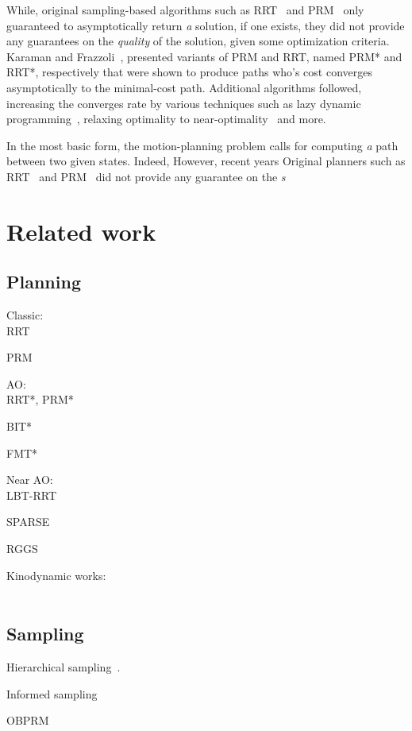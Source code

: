 \documentclass[letterpaper, 10 pt, conference]{ieeeconf}  %
\begin{document}
While, original sampling-based algorithms such as RRT~\cite{LK01} and PRM~\cite{KSLO96} only guaranteed to asymptotically return \emph{a} solution, if one exists, they did not provide any guarantees on the \emph{quality} of the solution, given some optimization criteria.
Karaman and Frazzoli~\cite{KF11}, presented variants of PRM and RRT, named PRM* and RRT*, respectively that were shown to produce paths who's cost converges asymptotically to the minimal-cost path.
Additional algorithms followed, increasing the converges rate by various techniques such as lazy dynamic programming~\cite{GSB15, JSCP15}, relaxing optimality to near-optimality~\cite{DB14, SH16} and more.


In the most basic form, the motion-planning problem calls for computing \emph{a} path between two given states.
Indeed, 
However, recent years 
Original planners such as RRT~\cite{LK01} and PRM~\cite{KSLO96} did not provide any guarantee on the \emph{s}


\section{Related work}


\subsection{Planning}


Classic:\\
RRT~\cite{LK01}

PRM~\cite{KSLO96}

AO:\\
RRT*, PRM*~\cite{KF11}

BIT*~\cite{GSB15}

FMT*~\cite{JSCP15}

Near AO:\\
LBT-RRT~\cite{SH16}

SPARSE~\cite{DB14}


RGGS~\cite{SSH16}


Kinodynamic works:\\~\cite{SL14, XBPA15, WB13, KF10}

\subsection{Sampling}

Hierarchical sampling~\cite{KTC16}.

Informed sampling~\cite{GSB14}

OBPRM~\cite{ABDJV98, YTEA12}
\end{document}
